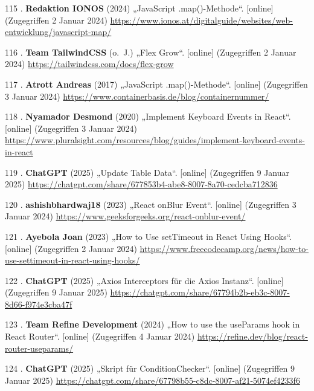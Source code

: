 \documentclass[
    headings=optiontotocandhead,%
    twoside,
    numbers=noenddot,%
    12pt, %
    titlepage, %
    parskip=full, %
    listof=leveldown, 
    numbers=noenddot, %
    a4paper,DIV=14,
    BCOR=15mm,
]{scrbook}
\newlength{\cslhangindent}
\newenvironment{cslreferences}%
  {\setlength{\parindent}{0pt}%
  \everypar{\setlength{\hangindent}{\cslhangindent}}\ignorespaces}%
  {\par}
\begin{document}
\begin{cslreferences}
\leavevmode\hypertarget{ref-Ionos-JS-map}{}%
115 . \textbf{Redaktion IONOS} (2024) „JavaScript .map()-Methode``.
{[}online{]} (Zugegriffen 2 Januar 2024)
\url{https://www.ionos.at/digitalguide/websites/web-entwicklung/javascript-map/}

\leavevmode\hypertarget{ref-TailwindCSS-Docs-FlexGrow}{}%
116 . \textbf{Team TailwindCSS} (o.~J.) „Flex Grow``. {[}online{]}
(Zugegriffen 2 Januar 2024) \url{https://tailwindcss.com/docs/flex-grow}

\leavevmode\hypertarget{ref-ContainerBasis-Containernummern}{}%
117 . \textbf{Atrott Andreas} (2017) „JavaScript .map()-Methode``.
{[}online{]} (Zugegriffen 3 Januar 2024)
\url{https://www.containerbasis.de/blog/containernummer/}

\leavevmode\hypertarget{ref-Pluralsight-KeyboardEvents}{}%
118 . \textbf{Nyamador Desmond} (2020) „Implement Keyboard Events in
React``. {[}online{]} (Zugegriffen 3 Januar 2024)
\url{https://www.pluralsight.com/resources/blog/guides/implement-keyboard-events-in-react}

\leavevmode\hypertarget{ref-gpt-updateTableData}{}%
119 . \textbf{ChatGPT} (2025) „Update Table Data``. {[}online{]}
(Zugegriffen 9 Januar 2025)
\url{https://chatgpt.com/share/677853b4-abe8-8007-8a70-cedcba712836}

\leavevmode\hypertarget{ref-GeeksForGeeks-onBlur}{}%
120 . \textbf{ashishbhardwaj18} (2023) „React onBlur Event``.
{[}online{]} (Zugegriffen 3 Januar 2024)
\url{https://www.geeksforgeeks.org/react-onblur-event/}

\leavevmode\hypertarget{ref-FreeCodeCamp-setTimeOut}{}%
121 . \textbf{Ayebola Joan} (2023) „How to Use setTimeout in React Using
Hooks``. {[}online{]} (Zugegriffen 2 Januar 2024)
\url{https://www.freecodecamp.org/news/how-to-use-settimeout-in-react-using-hooks/}

\leavevmode\hypertarget{ref-gpt-AxiosInterceptors}{}%
122 . \textbf{ChatGPT} (2025) „Axios Interceptors für die Axios
Instanz``. {[}online{]} (Zugegriffen 9 Januar 2025)
\url{https://chatgpt.com/share/67794b2b-eb3c-8007-8d66-f974e3cba47f}

\leavevmode\hypertarget{ref-Refine-ReactRouter}{}%
123 . \textbf{Team Refine Development} (2024) „How to use the useParams
hook in React Router``. {[}online{]} (Zugegriffen 4 Januar 2024)
\url{https://refine.dev/blog/react-router-useparams/}

\leavevmode\hypertarget{ref-gpt-ConditionsCheckerScript}{}%
124 . \textbf{ChatGPT} (2025) „Skript für ConditionChecker``.
{[}online{]} (Zugegriffen 9 Januar 2025)
\url{https://chatgpt.com/share/67798b55-c8dc-8007-af21-5074ef4233f6}


\end{cslreferences}
\end{document}
